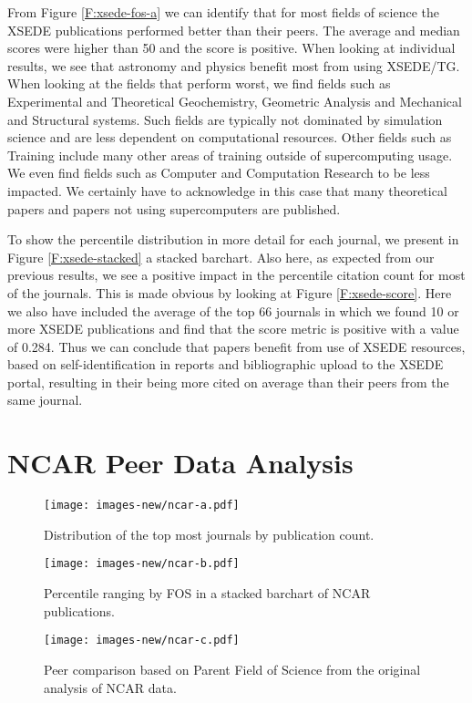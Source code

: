 \documentclass[10pt, conference, compsocconf]{IEEEtran}
\begin{document}
From Figure \ref{F:xsede-fos-a} we can identify that for most fields of science the XSEDE publications performed better than their peers. The average and median scores were higher than 50 and the score is positive. When looking at individual results, we see that astronomy and physics benefit most from using XSEDE/TG. When looking at the fields that perform worst, we find fields such as Experimental and Theoretical Geochemistry, Geometric Analysis and Mechanical and Structural systems. Such fields are typically not dominated by simulation science and are less dependent on computational resources. Other fields such as Training include many other areas of training outside of supercomputing usage. We even find fields such as Computer and Computation Research to be less impacted. We certainly have to acknowledge in this case that many theoretical papers and papers not using supercomputers are published. 

To show the percentile distribution in more detail for each journal, we present in Figure \ref{F:xsede-stacked} a stacked barchart. Also here, as expected from our previous results, we see a positive impact in the percentile citation count for most of the journals. This is made obvious by looking at Figure \ref{F:xsede-score}. Here we also have included the average of the top 66 journals in which we found 10 or more XSEDE publications and find that the score metric is positive with a value of 0.284. Thus we can conclude that papers benefit from use of XSEDE resources, based on self-identification in reports and bibliographic upload to the XSEDE portal, resulting in their being more cited on average than their peers from the same journal.



\section{NCAR Peer Data Analysis}\label{S:ncar}

\begin{figure}[h!] 
  \centering 
    \texttt{[image: images-new/ncar-a.pdf]} 
  \caption{Distribution of the top most journals by publication count.}\label{F:ncar-distribution} 

  \centering 
    \texttt{[image: images-new/ncar-b.pdf]} 
  \caption{Percentile ranging by FOS in a stacked barchart of NCAR publications.}\label{F:ncar-stacked-b} 

  \centering 
    \texttt{[image: images-new/ncar-c.pdf]} 
  \caption{Peer comparison based on Parent Field of Science from the original analysis of NCAR data.}\label{F:ncar-score}
\end{figure} 
\end{document}
